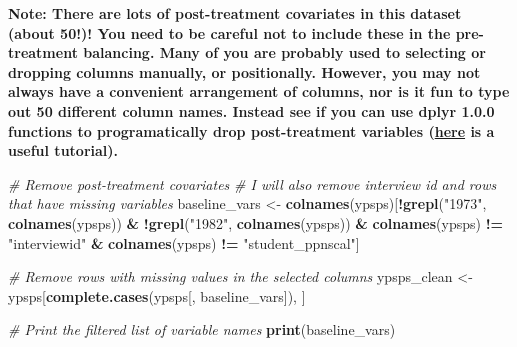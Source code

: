 \documentclass[
]{article}
\newenvironment{Shaded}{\begin{snugshade}}{\end{snugshade}}
\newcommand{\CommentTok}[1]{\textcolor[rgb]{0.56,0.35,0.01}{\textit{#1}}}
\newcommand{\FunctionTok}[1]{\textcolor[rgb]{0.13,0.29,0.53}{\textbf{#1}}}
\newcommand{\NormalTok}[1]{#1}
\newcommand{\OtherTok}[1]{\textcolor[rgb]{0.56,0.35,0.01}{#1}}
\newcommand{\SpecialCharTok}[1]{\textcolor[rgb]{0.81,0.36,0.00}{\textbf{#1}}}
\newcommand{\StringTok}[1]{\textcolor[rgb]{0.31,0.60,0.02}{#1}}
\begin{document}
\textbf{Note: There are lots of post-treatment covariates in this dataset (about 50!)! You need to be careful not to include these in the pre-treatment balancing. Many of you are probably used to selecting or dropping columns manually, or positionally. However, you may not always have a convenient arrangement of columns, nor is it fun to type out 50 different column names. Instead see if you can use dplyr 1.0.0 functions to programatically drop post-treatment variables (\href{https://www.tidyverse.org/blog/2020/03/dplyr-1-0-0-select-rename-relocate/}{here} is a useful tutorial).}

\begin{Shaded}
\begin{Highlighting}[]
\CommentTok{\# Remove post{-}treatment covariates}
\CommentTok{\# I will also remove interview id and rows that have missing variables }
\NormalTok{baseline\_vars }\OtherTok{\textless{}{-}} \FunctionTok{colnames}\NormalTok{(ypsps)[}\SpecialCharTok{!}\FunctionTok{grepl}\NormalTok{(}\StringTok{"1973"}\NormalTok{, }\FunctionTok{colnames}\NormalTok{(ypsps)) }\SpecialCharTok{\&}
                                 \SpecialCharTok{!}\FunctionTok{grepl}\NormalTok{(}\StringTok{"1982"}\NormalTok{, }\FunctionTok{colnames}\NormalTok{(ypsps)) }\SpecialCharTok{\&}
                                 \FunctionTok{colnames}\NormalTok{(ypsps) }\SpecialCharTok{!=} \StringTok{"interviewid"} \SpecialCharTok{\&}
                                 \FunctionTok{colnames}\NormalTok{(ypsps) }\SpecialCharTok{!=} \StringTok{"student\_ppnscal"}\NormalTok{]}

\CommentTok{\# Remove rows with missing values in the selected columns}
\NormalTok{ypsps\_clean }\OtherTok{\textless{}{-}}\NormalTok{ ypsps[}\FunctionTok{complete.cases}\NormalTok{(ypsps[, baseline\_vars]), ]}


\CommentTok{\# Print the filtered list of variable names}
\FunctionTok{print}\NormalTok{(baseline\_vars)}
\end{Highlighting}
\end{Shaded}
\end{document}
